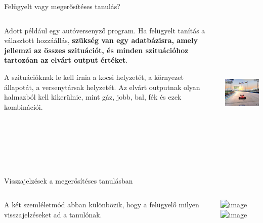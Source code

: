 \documentclass[english, aspectratio=169]{beamer}
\begin{document}
\begin{frame}{Felügyelt vagy megerősítéses tanulás?}
\begin{columns}
\begin{column}{.5\textwidth}
Adott például egy autóversenyző program. Ha felügyelt tanítás a választott hozzáállás, \textbf{szükség van egy adatbázisra, amely jellemzi az összes szituációt, és minden szituációhoz tartozóan az elvárt output értéket}.\par\medskip
A szituációknak le kell írnia a kocsi helyzetét, a környezet állapotát, a versenytársak helyzetét. Az elvárt outputnak olyan halmazból kell kikerülnie, mint gáz, jobb, bal, fék és ezek kombinációi.
\end{column}
\begin{column}{.5\textwidth}
\begin{center}
\includegraphics[width=6cm, height=7cm, keepaspectratio]{images/reinforcement_6.png}
\end{center}
\end{column}
\end{columns}
\end{frame}

\begin{frame}{Visszajelzések a megerősítéses tanulásban}
\begin{columns}
\begin{column}{.5\textwidth}
A két szemléletmód abban különbözik, hogy a felügyelő milyen visszajelzéseket ad a tanulónak.\par\medskip
{}
\end{column}
\begin{column}{.5\textwidth}
\begin{center}
\includegraphics<1>[width=7cm, height=7cm, keepaspectratio]{graphs/reinforcement_1.png}
\includegraphics<2>[width=7cm, height=7cm, keepaspectratio]{graphs/reinforcement_2.png}
\end{center}
\end{column}
\end{columns}
\end{frame}
\end{document}
